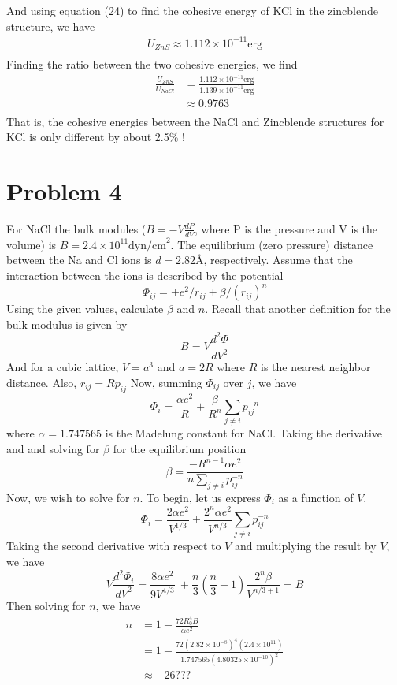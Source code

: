 \documentclass{article}
\begin{document}
And using equation (24) to find the cohesive energy of KCl in the zincblende structure, we have 
\begin{align*}
    U_{ZnS} \approx 1.112 \times 10^{-11} \text{erg} \\
\end{align*}
Finding the ratio between the two cohesive energies, we find
\begin{align*}
    \frac{U_{ZnS}}{U_{NaCl}} &= \frac{1.112 \times 10^{-11} \text{erg}}{1.139 \times 10^{-11} \text{erg}} \\
    &\approx 0.9763\\
\end{align*}
That is, the cohesive energies between the NaCl and Zincblende structures for KCl is only different by about 2.5\% !

\section*{Problem 4}
For NaCl the bulk modules ($B = -V\frac{dP}{dV}$, where P is the pressure and V is the volume) is $B = 2.4 \times 10^{11} \text{dyn/cm}^2$. The equilibrium (zero pressure) distance between the Na and Cl ions is $d = 2.82 \text{\AA}$, respectively. Assume that the interaction between the ions is described by the potential 
\[\Phi_{ij} = \pm e^2/r_{ij} + \beta /(r_{ij})^n\]
Using the given values, calculate $\beta$ and $n$.
\newline\newline
Recall that another definition for the bulk modulus is given by
\[B = V\frac{d^2\Phi}{dV^2}\]
And for a cubic lattice, $V = a^3$ and $a = 2R$ where $R$ is the nearest neighbor distance. Also, $r_{ij} = Rp_{ij}$ Now, summing $\Phi_{ij}$ over $j$, we have
\[\Phi_i = \frac{\alpha e^2}{R} + \frac{\beta}{R^n}\sum_{j\neq i}p_{ij}^{-n}\]
where $\alpha = 1.747565$ is the Madelung constant for NaCl. Taking the derivative and and solving for $\beta$ for the equilibrium position
\[\beta = \frac{-R^{n-1}\alpha e^2}{n \sum_{j\neq i}p_{ij}^{-n}}\]
Now, we wish to solve for $n$. To begin, let us express $\Phi_{i}$ as a function of $V$. 
\[\Phi_i = \frac{2\alpha e^2}{V^{1/3}} + \frac{2^n\alpha e^2}{V^{n/3}}\sum_{j\neq i} p_{ij}^{-n}\]
Taking the second derivative with respect to $V$ and multiplying the result by $V$, we have
\[V \frac{d^2\Phi_i}{dV^2} = \frac{8\alpha e^2}{9 V^{4/3}}\ + \frac{n}{3}\left(\frac{n}{3} + 1\right)\frac{2^n \beta }{V^{n/3 + 1}} = B\]
Then solving for $n$, we have
\begin{align*}
    n &= 1 - \frac{72 R_0^4 B}{\alpha e^2} \\
    &= 1 - \frac{72 (2.82\times 10^{-8})^4(2.4\times 10^{11})}{1.747565(4.80325\times10^{-10})^2} \\
    &\approx -26??? \\
\end{align*}
\end{document}
